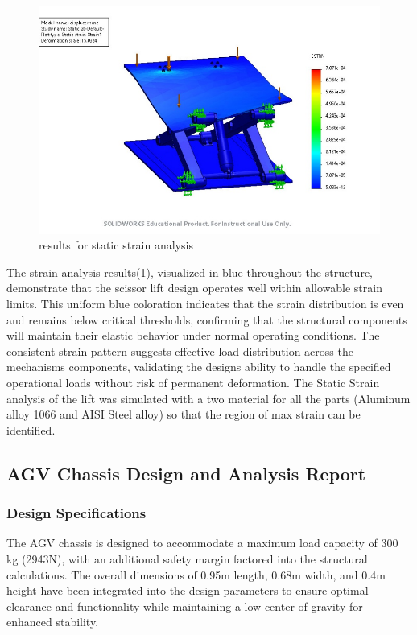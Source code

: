 \documentclass[../../main]{subfiles}
\begin{document}
\begin{figure}[h!]
  \centering
  \includegraphics[width=\textwidth]{img/image107.jpg}
  \caption{results for static strain analysis}
  \label{bmfig16}
  \end{figure}
  

The strain analysis results(\cref{bmfig16}), visualized in blue throughout the
structure, demonstrate that the scissor lift design operates well within
allowable strain limits. This uniform blue coloration indicates that the
strain distribution is even and remains below critical thresholds,
confirming that the structural components will maintain their elastic
behavior under normal operating conditions. The consistent strain
pattern suggests effective load distribution across the
mechanism\textquotesingle s components, validating the
design\textquotesingle s ability to handle the specified operational
loads without risk of permanent deformation. The Static Strain analysis
of the lift was simulated with a two material for all the parts
(Aluminum alloy 1066 and AISI Steel alloy) so that the region of max
strain can be identified.

\subsection{AGV Chassis Design and Analysis
Report}\label{agv-chassis-design-and-analysis-report}

\subsubsection{Design Specifications}\label{design-specifications}

The AGV chassis is designed to accommodate a maximum load capacity of
300 kg (2943N), with an additional safety margin factored into the
structural calculations. The overall dimensions of 0.95m length, 0.68m
width, and 0.4m height have been integrated into the design parameters
to ensure optimal clearance and functionality while maintaining a low
center of gravity for enhanced stability.
\end{document}
